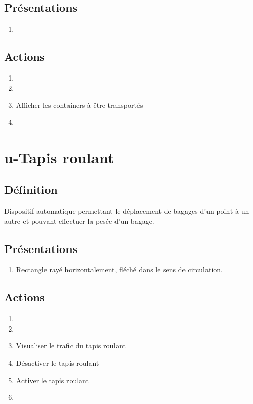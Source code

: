 \subsection{Présentations}
\begin{enumerate}
	\item \rectetiquette
\end{enumerate}

\subsection{Actions}
\begin{enumerate}
	\item {}
	\item {}
	\item Afficher les containers à être transportés
	\item \transit
\end{enumerate}

\section{u-Tapis roulant}
\subsection{Définition}
	Dispositif automatique permettant le déplacement de bagages d'un point à un autre et pouvant effectuer la pesée d'un
	bagage.

\subsection{Présentations}
\begin{enumerate}
	\item Rectangle rayé horizontalement, fléché dans le sens de
	circulation.
\end{enumerate}

\subsection{Actions}
\begin{enumerate}
	\item {}
	\item {}
	\item Visualiser le trafic du tapis roulant
	\item Désactiver le tapis roulant
	\item Activer le tapis roulant
	\item \etat
\end{enumerate}


